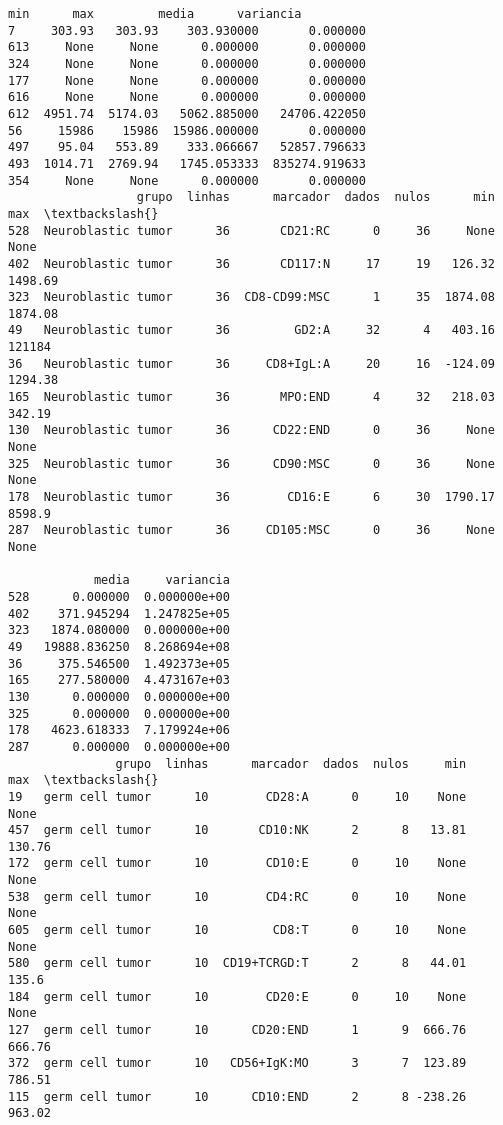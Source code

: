 \documentclass[11pt]{article}
\begin{document}
\begin{Verbatim}[commandchars=\\\{\}]
         min      max         media      variancia  
7     303.93   303.93    303.930000       0.000000  
613     None     None      0.000000       0.000000  
324     None     None      0.000000       0.000000  
177     None     None      0.000000       0.000000  
616     None     None      0.000000       0.000000  
612  4951.74  5174.03   5062.885000   24706.422050  
56     15986    15986  15986.000000       0.000000  
497    95.04   553.89    333.066667   52857.796633  
493  1014.71  2769.94   1745.053333  835274.919633  
354     None     None      0.000000       0.000000  
                  grupo  linhas      marcador  dados  nulos      min      max  \textbackslash{}
528  Neuroblastic tumor      36       CD21:RC      0     36     None     None   
402  Neuroblastic tumor      36       CD117:N     17     19   126.32  1498.69   
323  Neuroblastic tumor      36  CD8-CD99:MSC      1     35  1874.08  1874.08   
49   Neuroblastic tumor      36         GD2:A     32      4   403.16   121184   
36   Neuroblastic tumor      36     CD8+IgL:A     20     16  -124.09  1294.38   
165  Neuroblastic tumor      36       MPO:END      4     32   218.03   342.19   
130  Neuroblastic tumor      36      CD22:END      0     36     None     None   
325  Neuroblastic tumor      36      CD90:MSC      0     36     None     None   
178  Neuroblastic tumor      36        CD16:E      6     30  1790.17   8598.9   
287  Neuroblastic tumor      36     CD105:MSC      0     36     None     None   

            media     variancia  
528      0.000000  0.000000e+00  
402    371.945294  1.247825e+05  
323   1874.080000  0.000000e+00  
49   19888.836250  8.268694e+08  
36     375.546500  1.492373e+05  
165    277.580000  4.473167e+03  
130      0.000000  0.000000e+00  
325      0.000000  0.000000e+00  
178   4623.618333  7.179924e+06  
287      0.000000  0.000000e+00  
               grupo  linhas      marcador  dados  nulos     min     max  \textbackslash{}
19   germ cell tumor      10        CD28:A      0     10    None    None   
457  germ cell tumor      10       CD10:NK      2      8   13.81  130.76   
172  germ cell tumor      10        CD10:E      0     10    None    None   
538  germ cell tumor      10        CD4:RC      0     10    None    None   
605  germ cell tumor      10         CD8:T      0     10    None    None   
580  germ cell tumor      10  CD19+TCRGD:T      2      8   44.01   135.6   
184  germ cell tumor      10        CD20:E      0     10    None    None   
127  germ cell tumor      10      CD20:END      1      9  666.76  666.76   
372  germ cell tumor      10   CD56+IgK:MO      3      7  123.89  786.51   
115  germ cell tumor      10      CD10:END      2      8 -238.26  963.02   


\end{Verbatim}
\end{document}
